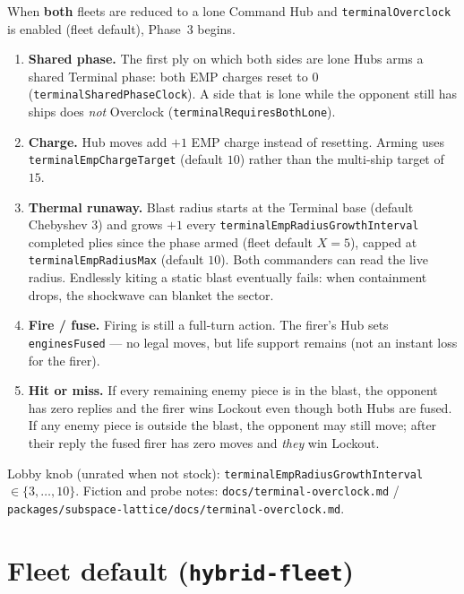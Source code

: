 \documentclass[11pt,a4paper]{article}
\begin{document}
When \textbf{both} fleets are reduced to a lone Command Hub and
\texttt{terminalOverclock} is enabled (fleet default), Phase~3 begins.

\begin{enumerate}[leftmargin=*]
  \item \textbf{Shared phase.}
        The first ply on which both sides are lone Hubs arms a shared Terminal
        phase: both EMP charges reset to $0$
        (\texttt{terminalSharedPhaseClock}). A side that is lone while the
        opponent still has ships does \emph{not} Overclock
        (\texttt{terminalRequiresBothLone}).
  \item \textbf{Charge.}
        Hub moves add $+1$ EMP charge instead of resetting. Arming uses
        \texttt{terminalEmpChargeTarget} (default $10$) rather than the
        multi-ship target of $15$.
  \item \textbf{Thermal runaway.}
        Blast radius starts at the Terminal base (default Chebyshev $3$) and
        grows $+1$ every \texttt{terminalEmpRadiusGrowthInterval} completed
        plies since the phase armed (fleet default $X = 5$), capped at
        \texttt{terminalEmpRadiusMax} (default $10$). Both commanders can read
        the live radius. Endlessly kiting a static blast eventually fails:
        when containment drops, the shockwave can blanket the sector.
  \item \textbf{Fire / fuse.}
        Firing is still a full-turn action. The firer's Hub sets
        \texttt{enginesFused} --- no legal moves, but life support remains
        (not an instant loss for the firer).
  \item \textbf{Hit or miss.}
        If every remaining enemy piece is in the blast, the opponent has zero
        replies and the firer wins Lockout even though both Hubs are fused.
        If any enemy piece is outside the blast, the opponent may still move;
        after their reply the fused firer has zero moves and \emph{they} win
        Lockout.
\end{enumerate}

Lobby knob (unrated when not stock): \texttt{terminalEmpRadiusGrowthInterval}
$\in \{3,\ldots,10\}$. Fiction and probe notes:
\texttt{docs/terminal-overclock.md} /
\texttt{packages/subspace-lattice/docs/terminal-overclock.md}.

\section{Fleet default (\texttt{hybrid-fleet})}
\label{sec:clock}
\label{sec:fleet-preset}
\end{document}
